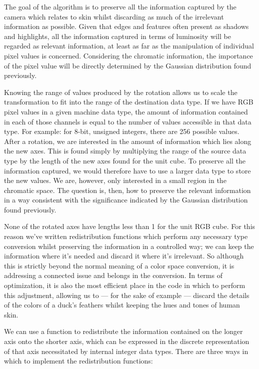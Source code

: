 The goal of the algorithm is to preserve all the information captured by the camera which relates to skin whilst discarding as much of the irrelevant information as possible. Given that edges and features often present as shadows and highlights, all the information captured in terms of luminosity will be regarded as relevant information, at least as far as the manipulation of individual pixel values is concerned. Considering the chromatic information, the importance of the pixel value will be directly determined by the Gaussian distribution found previously.

Knowing the range of values produced by the rotation allows us to scale the transformation to fit into the range of the destination data type. If we have RGB pixel values in a given machine data type, the amount of information contained in each of those channels is equal to the number of values accessible in that data type. For example: for 8-bit, unsigned integers, there are 256 possible values. After a rotation, we are interested in the amount of information which lies along the new axes. This is found simply by multiplying the range of the source data type by the length of the new axes found for the unit cube. To preserve all the information captured, we would therefore have to use a larger data type to store the new values. We are, however, only interested in a small region in the chromatic space. The question is, then, how to preserve the relevant information in a way consistent with the significance indicated by the Gaussian distribution found previously.


None of the rotated axes have lengths less than 1 for the unit RGB cube. For this reason we've written redistribution functions which perform any necessary type conversion whilst preserving the information in a controlled way; we can keep the information where it's needed and discard it where it's irrelevant. So although this is strictly beyond the normal meaning of a color space conversion, it is addressing a connected issue and belongs in the conversion. In terms of optimization, it is also the most efficient place in the code in which to perform this adjustment, allowing us to --- for the sake of example --- discard the details of the colors of a duck's feathers whilst keeping the hues and tones of human skin.

We can use a function to redistribute the information contained on the longer axis onto the shorter axis, which can be expressed in the discrete representation of that axis necessitated by internal integer data types. There are three ways in which to implement the redistribution functions:

